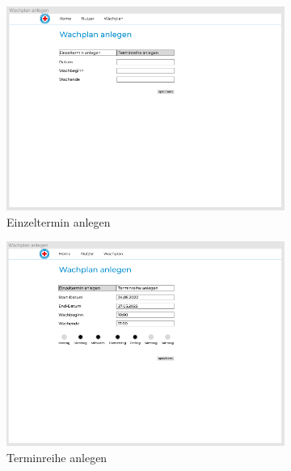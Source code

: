 \documentclass[fontsize=12pt,openright,oneside,paper=a4,BCOR=1cm]{scrbook}
\begin{document}
\begin{figure}[H]
  \centering
  \begin{subfigure}[b]{0.7\linewidth}
    \includegraphics[width=\linewidth]{Anlagen/Figma/10-Wachplananlegen.png}
    \caption{Einzeltermin anlegen}
  \end{subfigure}
  \begin{subfigure}[b]{0.7\linewidth}
    \includegraphics[width=\linewidth]{Anlagen/Figma/12-WachplanReiheAnlegenBef.png}
    \caption{Terminreihe anlegen}
  \end{subfigure}
  \begin{subfigure}[b]{0.7\linewidth}

\end{subfigure}
\end{figure}
\end{document}
